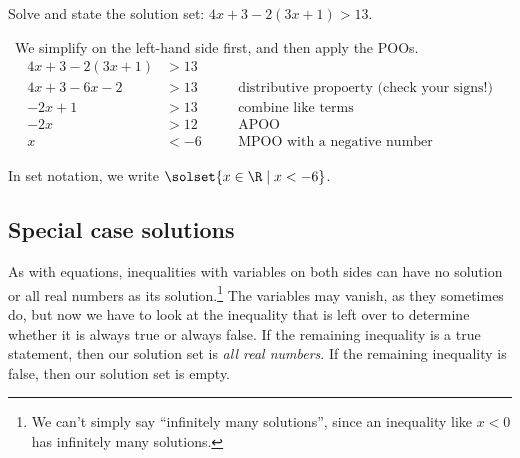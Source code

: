 \begin{boxex}
Solve and state the solution set: $4x+3-2(3x + 1) > 13$.

\exsoln\ We simplify on the left-hand side first, and then apply the POOs.
\[\begin{aligned}
4x+3-2(3x + 1)	&> 13
&& \quad\text{}\\
4x+3-6x-2		&> 13
&& \quad\text{distributive propoerty (check your signs!)}\\
-2x+1			&> 13
&& \quad\text{combine like terms}\\
-2x				&> 12
&& \quad\text{APOO}\\
x				&< -6
&& \quad\text{MPOO with a negative number}
\end{aligned}\]

In set notation, we write $\solset{x \in \R \mid x < -6}$.
\end{boxex}

%
%
%

\subsection{Special case solutions}

As with equations, inequalities with variables on both sides can have no solution or all real numbers as its solution.\footnote{We can't simply say ``infinitely many solutions'', since an inequality like $x<0$ has infinitely many solutions.} The variables may vanish, as they sometimes do, but now we have to look at the inequality that is left over to determine whether it is always true or always false. If the remaining inequality is a true statement, then our solution set is \textit{all real numbers}. If the remaining inequality is false, then our solution set is empty.

